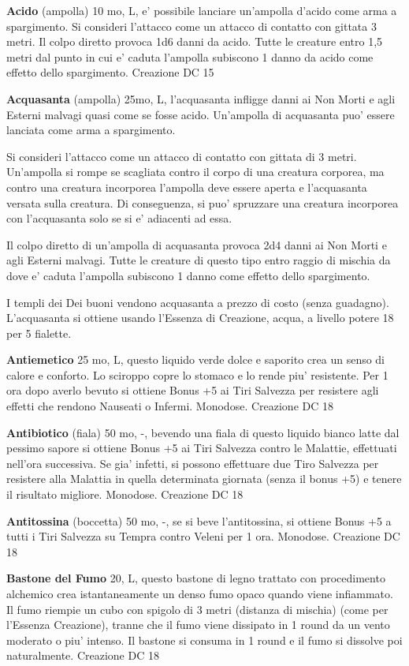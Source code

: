\documentclass[a4paper,11pt,twoside,openany]{book}
\begin{document}
{		\textbf{Acido} (ampolla) 10 mo, L, e' possibile lanciare un'ampolla d'acido come arma a spargimento. Si consideri l'attacco come un attacco di contatto con gittata 3 metri. Il colpo diretto provoca 1d6 danni da acido. Tutte le creature entro 1,5 metri dal punto in cui e' caduta l'ampolla subiscono 1 danno da acido come effetto dello spargimento.
		Creazione DC 15
		
		\textbf{Acquasanta} (ampolla) 25mo, L, l'acquasanta infligge danni ai Non Morti e agli Esterni malvagi quasi come se fosse acido. Un'ampolla di acquasanta puo' essere lanciata come arma a spargimento.
		
		Si consideri l'attacco come un attacco di contatto con gittata di 3 metri. Un'ampolla si rompe se scagliata contro il corpo di una creatura corporea, ma contro una creatura incorporea l'ampolla deve essere aperta e l'acquasanta versata sulla creatura. Di conseguenza, si puo' spruzzare una creatura incorporea con l'acquasanta solo se si e' adiacenti ad essa.
		
		Il colpo diretto di un'ampolla di acquasanta provoca 2d4 danni ai Non Morti e agli Esterni malvagi. Tutte le creature di questo tipo entro raggio di mischia da dove e' caduta l'ampolla subiscono 1 danno come effetto dello spargimento.
		
		I templi dei Dei buoni vendono acquasanta a prezzo di costo (senza guadagno). L'acquasanta si ottiene usando l'Essenza di Creazione, acqua, a livello potere 18 per 5 fialette.
		
		\textbf{Antiemetico} 25 mo, L, questo liquido verde dolce e saporito crea un senso di calore e conforto. Lo sciroppo copre lo stomaco e lo rende piu' resistente. Per 1 ora dopo averlo bevuto si ottiene Bonus +5 ai Tiri Salvezza per resistere agli effetti che rendono Nauseati o Infermi. Monodose. Creazione DC 18
		
		\textbf{Antibiotico} (fiala) 50 mo, -,  bevendo una fiala di questo liquido bianco latte dal pessimo sapore si ottiene Bonus +5 ai Tiri Salvezza contro le Malattie, effettuati nell'ora successiva. Se gia' infetti, si possono effettuare due Tiro Salvezza per resistere alla Malattia in quella determinata giornata (senza il bonus +5) e tenere il risultato migliore. Monodose. Creazione DC 18
		
		\textbf{Antitossina} (boccetta) 50 mo, -, se si beve l'antitossina, si ottiene Bonus +5 a tutti i Tiri Salvezza su Tempra contro Veleni per 1 ora. Monodose. Creazione DC 18
		
		\textbf{Bastone del Fumo} 20, L, questo bastone di legno trattato con procedimento alchemico crea istantaneamente un denso fumo opaco quando viene infiammato. Il fumo riempie un cubo con spigolo di 3 metri (distanza di mischia) (come per l'Essenza Creazione), tranne che il fumo viene dissipato in 1 round da un vento moderato o piu' intenso. Il bastone si consuma in 1 round e il fumo si dissolve
		poi naturalmente. Creazione DC 18
		
}
\end{document}
